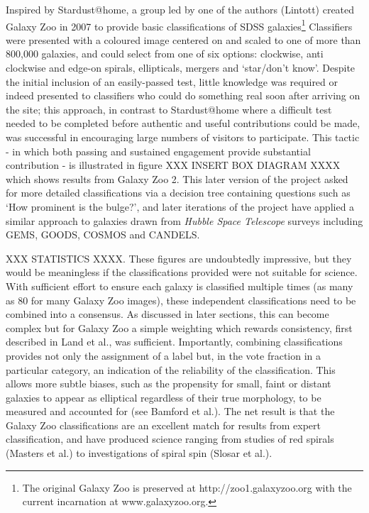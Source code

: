 \documentclass{ar2e}
\begin{document}
Inspired by Stardust@home, a group led by one of the authors (Lintott) created
Galaxy Zoo in 2007 to provide basic classifications of SDSS
galaxies\footnote{The original Galaxy Zoo is preserved at
http://zoo1.galaxyzoo.org with the current incarnation at www.galaxyzoo.org.}
Classifiers were presented with a coloured image centered on and scaled to one
of more than 800,000 galaxies, and could select from one of six options:
clockwise, anti clockwise and edge-on spirals, ellipticals, mergers and
`star/don't know'. Despite the initial inclusion of an easily-passed test,
little knowledge was required or indeed presented to classifiers who could do
something real soon after arriving on the site; this approach, in contrast to
Stardust@home where a difficult test needed to be completed before authentic
and useful contributions could be made, was successful in encouraging large
numbers of visitors to participate. This tactic - in which both passing and
sustained engagement provide substantial contribution - is illustrated in
figure XXX INSERT BOX DIAGRAM XXXX which shows results from Galaxy Zoo 2. This
later version of the project asked for more detailed classifications via a
decision tree containing questions such as `How prominent is the bulge?', and
later iterations of the project have applied a similar approach to galaxies
drawn from \emph{Hubble Space Telescope} surveys including \textsc{GEMS,
GOODS, COSMOS} and \textsc{CANDELS}. 

XXX STATISTICS XXXX. These figures are undoubtedly impressive, but they would
be meaningless if the classifications provided were not suitable for science.
With sufficient effort to ensure each galaxy is classified multiple times (as
many as 80 for many Galaxy Zoo images), these independent classifications need
to be combined into a consensus. As discussed in later sections, this can
become complex but for Galaxy Zoo a simple weighting which rewards
consistency, first described in Land et al., was sufficient. Importantly,
combining classifications provides not only the assignment of a label but, in
the vote fraction in a particular category, an indication of the reliability
of the classification. This allows more subtle biases, such as the propensity
for small, faint or distant galaxies to appear as elliptical regardless of
their true morphology, to be measured and accounted for (see Bamford et al.).
The net result is that the Galaxy Zoo classifications are an excellent match
for results from expert classification, and have produced science ranging from
studies of red spirals (Masters et al.) to investigations of spiral spin
(Slosar et al.).
\end{document}
